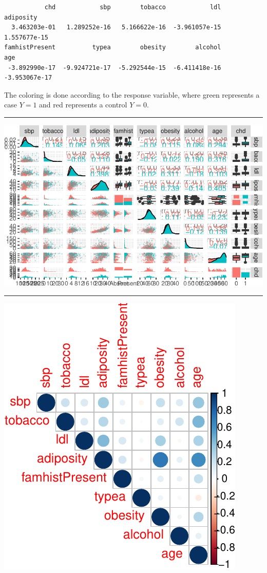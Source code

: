 \documentclass[
  letterpaper,
  DIV=11,
  numbers=noendperiod]{scrartcl}
\begin{document}
\begin{verbatim}
           chd            sbp        tobacco            ldl      adiposity 
  3.463203e-01   1.289252e-16   5.166622e-16  -3.961057e-15   1.557677e-15 
famhistPresent          typea        obesity        alcohol            age 
 -3.892990e-17  -9.924721e-17  -5.292544e-15  -6.411418e-16  -3.953067e-17 
\end{verbatim}

The coloring is done according to the response variable, where green
represents a case \(Y=1\) and red represents a control \(Y=0\).

\begin{center}\rule{0.5\linewidth}{0.5pt}\end{center}

\includegraphics{L10_files/figure-pdf/unnamed-chunk-6-1.pdf}

\begin{center}\rule{0.5\linewidth}{0.5pt}\end{center}

\includegraphics{L10_files/figure-pdf/unnamed-chunk-7-1.pdf}
\end{document}
